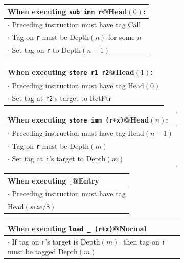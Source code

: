 \begin{figure}
  \begin{subfigure}{\textwidth}
    \begin{tabular}{|l|}
      \hline
      When executing {\tt sub imm r}@{\sc Head}\((0)\): \\
      \hline
      \rowcolor{red!20}
      \(\cdot\) Preceding instruction must have tag {\sc Call} \\
      \rowcolor{blue!30}
      \(\cdot\) Tag on {\tt r} must be {\sc Depth}\((n)\) for some \(n\) \\
      \rowcolor{blue!30}
      \(\cdot\) Set tag on {\tt r} to {\sc Depth}\((n+1)\) \\
      \hline
    \end{tabular}
   \begin{tabular}{|l|}
      \hline
      When executing {\tt store r1 r2}@{\sc Head}\((1)\): \\
      \hline
      \rowcolor{red!20}
      \(\cdot\) Preceding instruction must have tag {\sc Head}\((0)\) \\
      \rowcolor{red!20}
      \(\cdot\) Set tag at {\tt r2}'s target to {\sc RetPtr} \\
      \hline
    \end{tabular}
    
    \begin{tabular}{|l|}
      \hline
      When executing {\tt store imm (r+x)}@{\sc Head}\((n)\): \\
      \hline
      \rowcolor{red!20}
      \(\cdot\) Preceding instruction must have tag {\sc Head}\((n-1)\) \\
      \rowcolor{blue!30}
      \(\cdot\) Tag on {\tt r} must be {\sc Depth}\((m)\) \\
      \rowcolor{blue!30}
      \(\cdot\) Set tag at {\tt r}'s target to {\sc Depth}\((m)\) \\
      \hline
    \end{tabular}
    \begin{tabular}{|l|}
      \hline
      When executing \(\underline{~~}\)@{\sc Entry} \\
      \hline
      \rowcolor{red!20}
      \(\cdot\) Preceding instruction must have tag \\
      \rowcolor{red!20} {\sc Head}\((size / 8)\) \\
      \hline
    \end{tabular}
    
    \begin{tabular}{|l|}
      \hline
      When executing {\tt load \_ (r+x)}@{\sc Normal} \\
      \hline
      \rowcolor{blue!30}
      \(\cdot\) If tag on {\tt r}'s target is {\sc Depth}\((m)\), then
      tag on {\tt r} must be tagged {\sc Depth}\((m)\) \\
      \hline
    \end{tabular}
    

\end{subfigure}
\end{figure}
